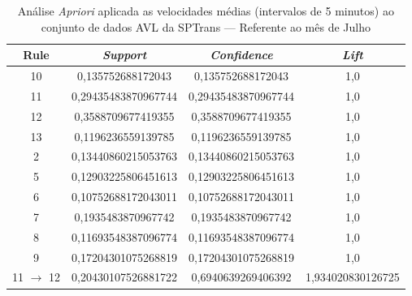 \documentclass[
	12pt,				%
	oneside,			%
	a4paper,			%
	english,			%
	brazil				%
	]{abntex2ppgsi}
\begin{document}
\begin{apendicesenv}
\begin{table}[!htb]
\centering
\caption {Análise \textit{Apriori} aplicada as velocidades médias (intervalos de 5 minutos) ao conjunto de dados AVL da SPTrans --- Referente ao mês de Julho}
\label {tab:aprioriJuly}
\begin{tabular}{c|c|c|c}
\hline
\textbf{Rule} & \textit{\textbf{Support}} & \textit{\textbf{Confidence}} & \textit{\textbf{Lift}} \\
\hline
10 &  0,135752688172043 &  0,135752688172043 &  1,0\\
\hline
11 &  0,29435483870967744 &  0,29435483870967744 &  1,0\\
\hline
12 &  0,3588709677419355 &  0,3588709677419355 &  1,0\\
\hline
13 &  0,1196236559139785 &  0,1196236559139785 &  1,0\\
\hline
2 &  0,13440860215053763 &  0,13440860215053763 &  1,0\\
\hline
5 &  0,12903225806451613 &  0,12903225806451613 &  1,0\\
\hline
6 &  0,10752688172043011 &  0,10752688172043011 &  1,0\\
\hline
7 &  0,1935483870967742 &  0,1935483870967742 &  1,0\\
\hline
8 &  0,11693548387096774 &  0,11693548387096774 &  1,0\\
\hline
9 &  0,17204301075268819 &  0,17204301075268819 &  1,0\\
\hline
11 $\rightarrow$ 12 &  0,20430107526881722 &  0,6940639269406392 &  1,934020830126725\\
\hline
\end{tabular}
\end{table}


\end{apendicesenv}
\end{document}
